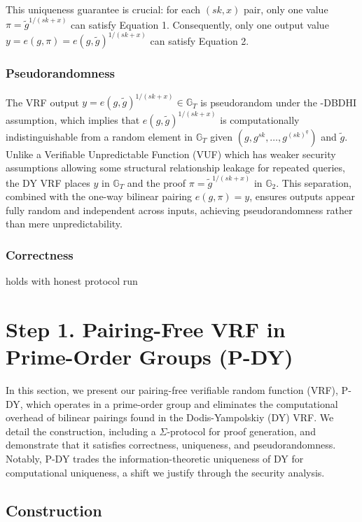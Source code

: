 This uniqueness guarantee is crucial: for each $(sk,x)$ pair, only one value $\pi = \tilde{g}^{1/(sk+x)}$ can satisfy Equation 1. Consequently, only one output value $y = e(g, \pi) = e(g, \tilde{g})^{1/(sk+x)}$ can satisfy Equation 2.


\subsubsection*{Pseudorandomness}
The VRF output $ y = e(g, \tilde{g})^{1/(sk + x)} \in \mathbb{G}_T $ is pseudorandom under the $ $-DBDHI assumption, which implies that $ e(g, \tilde{g})^{1/(sk + x)} $ is computationally indistinguishable from a random element in $ \mathbb{G}_T $ given $ (g, g^{sk}, \ldots, g^{(sk)^q}) $ and $ \tilde{g} $. Unlike a Verifiable Unpredictable Function (VUF) which has weaker security assumptions allowing some structural relationship leakage for repeated queries, the DY VRF places $ y $ in $ \mathbb{G}_T $ and the proof $ \pi = \tilde{g}^{1/(sk + x)} $ in $ \mathbb{G}_2 $. This separation, combined with the one-way bilinear pairing $ e(g, \pi) = y $, ensures outputs appear fully random and independent across inputs, achieving pseudorandomness rather than mere unpredictability.


\subsubsection*{Correctness} holds with honest protocol run





\section{Step 1. Pairing-Free VRF in Prime-Order Groups (P-DY)}

In this section, we present our pairing-free verifiable random function (VRF), P-DY, which operates in a prime-order group and eliminates the computational overhead of bilinear pairings found in the Dodis-Yampolskiy (DY) VRF. We detail the construction, including a $\Sigma$-protocol for proof generation, and demonstrate that it satisfies correctness, uniqueness, and pseudorandomness. Notably, P-DY trades the information-theoretic uniqueness of DY for computational uniqueness, a shift we justify through the security analysis.

\subsection{Construction}

